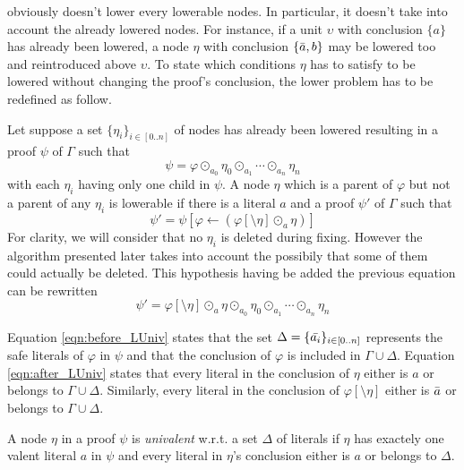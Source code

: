 \documentclass{llncs}
\begin{document}
{\LowerUnits} obviously doesn't lower every lowerable nodes. In particular, it doesn't take into
account the already lowered nodes. For instance, if a unit $\upsilon$ with conclusion $\{a\}$ has already been
lowered, a node $\eta$ with conclusion $\{\bar{a},b\}$ may be lowered too and reintroduced above
$\upsilon$. To state which conditions $\eta$ has to satisfy to be lowered without changing the
proof's conclusion, the lower problem has to be redefined as follow.

Let suppose a set $\{\eta_i\}_{i \in [0..n]}$ of nodes has already been lowered resulting in a proof
$\psi$ of $\Gamma$ such that
\begin{equation} \label{eqn:before_LUniv}
  \psi = \varphi \odot_{a_0} \eta_0 \odot_{a_1} \cdots \odot_{a_n} \eta_n
\end{equation}
with each $\eta_i$ having only one child in $\psi$. A node $\eta$ which is a parent of $\varphi$ but
not a parent of any $\eta_i$ is lowerable if there is a literal $a$ and a proof $\psi'$ of
$\Gamma$ such that
\begin{equation}
  \psi' = \psi[\varphi \leftarrow (\varphi[\setminus \eta] \odot_a \eta)]
\end{equation}
For clarity, we will consider that no $\eta_i$ is deleted during fixing. However the algorithm
presented later takes into account the possibily that some of them could actually be deleted. This
hypothesis having be added the previous equation can be rewritten
\begin{equation} \label{eqn:after_LUniv}
  \psi' = \varphi[\setminus \eta] \odot_a \eta \odot_{a_0} \eta_0 \odot_{a_1} \cdots \odot_{a_n} \eta_n
\end{equation}

Equation \ref{eqn:before_LUniv} states that the set $\Delta = \{\bar{a_i}\}_{i \in [0..n]}$
represents the safe literals of $\varphi$ in $\psi$ and that the conclusion of $\varphi$ is included
in $\Gamma \cup \Delta$. Equation \ref{eqn:after_LUniv} states that every literal in the conclusion
of $\eta$ either is $a$ or belongs to $\Gamma \cup \Delta$. Similarly, every literal in the
conclusion of $\varphi[\setminus \eta]$ either is $\bar{a}$ or belongs to $\Gamma \cup \Delta$.

\begin{definition}
A node $\eta$ in a proof $\psi$ is \emph{univalent} w.r.t. a set $\Delta$ of literals if $\eta$ has
exactely one valent literal $a$ in $\psi$ and every literal in $\eta$'s conclusion either is $a$ or
belongs to $\Delta$.
\end{definition}
\end{document}
